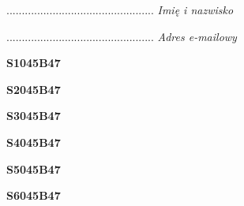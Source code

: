 \begin{turn}{90}\begin{minipage}{\linewidth} \vspace{20mm} ................................................  \textit{Imię i nazwisko}\end{minipage}\end{turn}

\begin{turn}{90}\begin{minipage}{\linewidth} \vspace{20mm} ................................................  \textit{Adres e-mailowy}\end{minipage}\end{turn}

\begin{turn}{90}\huge \begin{minipage}{\linewidth} \vspace{10mm}\textbf{S1045B47}\end{minipage}\end{turn}

\begin{turn}{90}\huge \begin{minipage}{\linewidth} \vspace{10mm}\textbf{S2045B47}\end{minipage}\end{turn}

\begin{turn}{90}\huge \begin{minipage}{\linewidth} \vspace{10mm}\textbf{S3045B47}\end{minipage}\end{turn}

\begin{turn}{90}\huge \begin{minipage}{\linewidth} \vspace{10mm}\textbf{S4045B47}\end{minipage}\end{turn}

\begin{turn}{90}\huge \begin{minipage}{\linewidth} \vspace{10mm}\textbf{S5045B47}\end{minipage}\end{turn}

\begin{turn}{90}\huge \begin{minipage}{\linewidth} \vspace{10mm}\textbf{S6045B47}\end{minipage}\end{turn}

